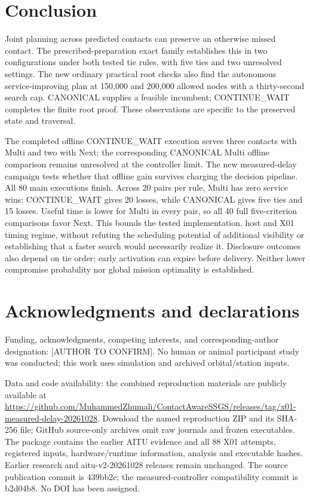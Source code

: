 \documentclass[12pt,a4paper]{article}
\begin{document}
\section*{Conclusion}
Joint planning across predicted contacts can preserve an otherwise missed contact. The prescribed-preparation exact family establishes this in two configurations under both tested tie rules, with five ties and two unresolved settings. The new ordinary practical root checks also find the autonomous service-improving plan at 150,000 and 200,000 allowed nodes with a thirty-second search cap. CANONICAL supplies a feasible incumbent; CONTINUE\_WAIT completes the finite root proof. These observations are specific to the preserved state and traversal.

The completed offline CONTINUE\_WAIT execution serves three contacts with Multi and two with Next; the corresponding CANONICAL Multi offline comparison remains unresolved at the controller limit. The new measured-delay campaign tests whether that offline gain survives charging the decision pipeline. All 80 main executions finish. Across 20 pairs per rule, Multi has zero service wins: CONTINUE\_WAIT gives 20 losses, while CANONICAL gives five ties and 15 losses. Useful time is lower for Multi in every pair, so all 40 full five-criterion comparisons favor Next. This bounds the tested implementation, host and X01 timing regime, without refuting the scheduling potential of additional visibility or establishing that a faster search would necessarily realize it. Disclosure outcomes also depend on tie order; early activation can expire before delivery. Neither lower compromise probability nor global mission optimality is established.

\section*{Acknowledgments and declarations}
Funding, acknowledgments, competing interests, and corresponding-author designation: [AUTHOR TO CONFIRM]. No human or animal participant study was conducted; this work uses simulation and archived orbital/station inputs.

Data and code availability: the combined reproduction materials are publicly available at \url{https://github.com/MuhammedZhumali/ContactAwareSSGS/releases/tag/x01-measured-delay-20261028}. Download the named reproduction ZIP and its SHA-256 file; GitHub source-only archives omit raw journals and frozen executables. The package contains the earlier AITU evidence and all 88 X01 attempts, registered inputs, hardware/runtime information, analysis and executable hashes. Earlier research and aitu-v2-20261028 releases remain unchanged. The source publication commit is 439bb2e; the measured-controller compatibility commit is b2d04b8. No DOI has been assigned.
\end{document}
